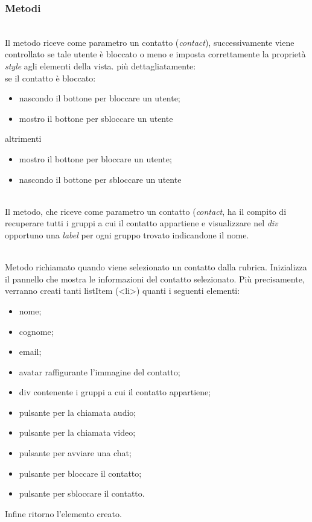 \subsubsection*{Metodi}
\begin{description}
\item{}\\
	Il metodo riceve come parametro un contatto (\textit{contact}), successivamente viene controllato se tale utente è bloccato o meno e imposta correttamente la proprietà \textit{style} agli elementi della vista. più dettagliatamente:\\
se il contatto è bloccato:
\begin{itemize}
\item nascondo il bottone per bloccare un utente;
\item mostro il bottone per sbloccare un utente
\end{itemize}
altrimenti\\
\begin{itemize}
\item mostro il bottone per bloccare un utente;
\item nascondo il bottone per sbloccare un utente
\end{itemize}


\item{}\\
Il metodo, che riceve come parametro un contatto (\textit{contact}, ha il compito di recuperare tutti i gruppi 
 a cui il contatto appartiene e visualizzare nel \textit{div} opportuno una \textit{label} per ogni gruppo trovato indicandone il nome. 

\item{}\\
Metodo richiamato quando viene selezionato un contatto dalla rubrica. Inizializza il pannello che mostra le informazioni del contatto selezionato. Più precisamente, verranno creati tanti listItem (<li>) quanti i seguenti elementi:
\begin{itemize}
\item nome;
\item cognome;
\item email;
\item avatar raffigurante l'immagine del contatto;
\item div contenente i gruppi a cui il contatto appartiene;
\item pulsante per la chiamata audio;
\item pulsante per la chiamata video;
\item pulsante per avviare una chat;
\item pulsante per bloccare il contatto;
\item pulsante per sbloccare il contatto.
\end{itemize}
Infine ritorno l'elemento creato.
	

\end{description}
